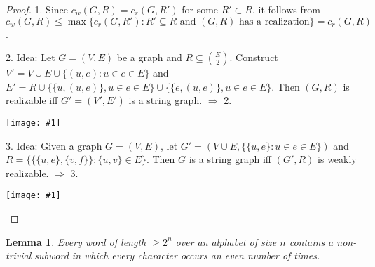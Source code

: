 \documentclass[12pt]{article}
\theoremstyle{plain} %
\newtheorem{lemma}[theorem]{Lemma}
\newcommand{\set}[1]{\{#1\}}
\newcommand{\image}[1]{\begin{center}\texttt{[image: \#1]}\end{center}}
\begin{document}
\begin{proof}
1. Since \(c_w(G, R) = c_r(G, R')\) for some \(R' \subset R\), it follows from \(c_w(G, R) \leq \max\set{c_r(G, R'): R' \subseteq R \text{ and } (G,R) \text{ has a realization}} = c_r(G, R) \).

2. Idea: Let \(G = (V, E)\) be a graph and \(R \subseteq \binom{E}{2}\). Construct \(V' = V \cup E \cup \set{(u, e) : u \in e \in E}\) 
and \(E' = R \cup \set{ \set{u, (u,e)}, u \in e \in E} \cup \set{\set{e, (u,e)}, u\in e \in E}\). Then \((G, R)\) is realizable iff 
\(G' = (V', E')\) is a string graph. \(\Rightarrow \) 2.

\image{images/figure-2.pdf}

3. Idea: Given a graph \(G = (V, E)\), let \(G' = (V \cup E, \set{\set{u,e} : u \in e \in E})\) and 
\(R = \set{\set{\set{u,e}, \set{v,f}} : \set{u,v} \in E}\). Then \(G\) is a string graph iff \((G', R)\) 
is weakly realizable. \(\Rightarrow \) 3.

\image{images/figure-3.pdf}
\end{proof}

\begin{lemma}\label{lem:even-occurences}
    Every word of length \(\geq 2^n\) over an alphabet of size \(n\) contains a non-trivial subword in which every character occurs an even number of times.
\end{lemma}
\end{document}
